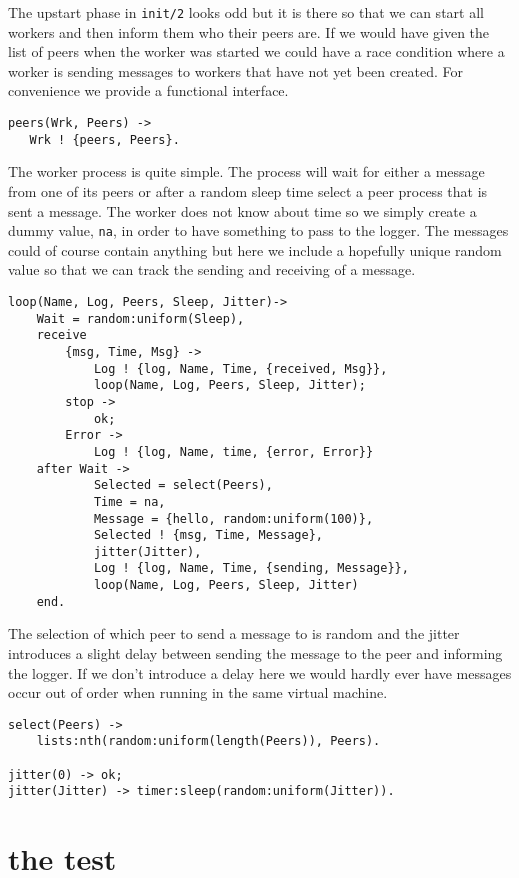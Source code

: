 \documentclass[a4paper, 11pt]{article}
\begin{document}
The upstart phase in {\tt init/2} looks odd but it is there so that we
can start all workers and then inform them who their peers are. If we
would have given the list of peers when the worker was started we
could have a race condition where a worker is sending messages to
workers that have not yet been created. For convenience we provide a
functional interface.

\begin{verbatim}
peers(Wrk, Peers) ->
   Wrk ! {peers, Peers}.
\end{verbatim}

The worker process is quite simple. The process will wait for either a
message from one of its peers or after a random sleep time select a
peer process that is sent a message. The worker does not know about
time so we simply create a dummy value, {\tt na}, in order to have
something to pass to the logger. The messages could of course contain
anything but here we include a hopefully unique random value so that
we can track the sending and receiving of a message.

\begin{verbatim}
loop(Name, Log, Peers, Sleep, Jitter)->
    Wait = random:uniform(Sleep),
    receive 
        {msg, Time, Msg} ->
            Log ! {log, Name, Time, {received, Msg}},
            loop(Name, Log, Peers, Sleep, Jitter);
        stop ->
            ok;
        Error ->
            Log ! {log, Name, time, {error, Error}}
    after Wait ->
            Selected = select(Peers),
            Time = na,
            Message = {hello, random:uniform(100)},
            Selected ! {msg, Time, Message},
            jitter(Jitter),
            Log ! {log, Name, Time, {sending, Message}},        
            loop(Name, Log, Peers, Sleep, Jitter)
    end.
\end{verbatim}

The selection of which peer to send a message to is random and the
jitter introduces a slight delay between sending the message to the
peer and informing the logger. If we don't introduce a delay here we
would hardly ever have messages occur out of order when running in the
same virtual machine.

\begin{verbatim}        
select(Peers) ->
    lists:nth(random:uniform(length(Peers)), Peers).

jitter(0) -> ok;
jitter(Jitter) -> timer:sleep(random:uniform(Jitter)).
\end{verbatim}


\section{the test}
\end{document}
